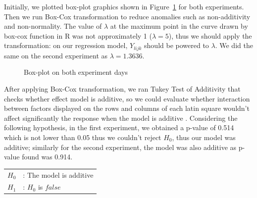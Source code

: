 Initially, we plotted box-plot graphics shown in Figure~\ref{fig:boxplot} for both experiments. Then we run Box-Cox transformation to reduce anomalies such as non-additivity and non-normality. The value of $\lambda$ at the maximum point in the curve drawn by box-cox function in R was not approximately 1 ($\lambda = 5$), thus we should apply the transformation: on our regression model, $Y_{lijk}$ should be powered to $\lambda$. We did the same on the second experiment as $\lambda = 1.3636$.

\begin{figure}%
    \centering
    \qquad
    \caption{Box-plot on both experiment days}%
    \label{fig:boxplot}%
\end{figure}

After applying Box-Cox transformation, we ran Tukey Test of Additivity that checks whether effect model is additive, so we could evaluate whether interaction between factors displayed on the rows and columns of each latin square wouldn't affect significantly the response when the model is additive \cite{box}. Considering the following hypothesis, in the first experiment, we obtained a p-value of 0.514 which is not lower than 0.05 thus we couldn't reject $H_{0}$, thus our model was additive; similarly for the second experiment, the model was also additive as p-value found was 0.914.

\begin{tabular}{ll}
$H_{0}$ & : The model is additive \\
$H_{1}$ & : $H_{0}$ is $false$ \\
\end{tabular}

